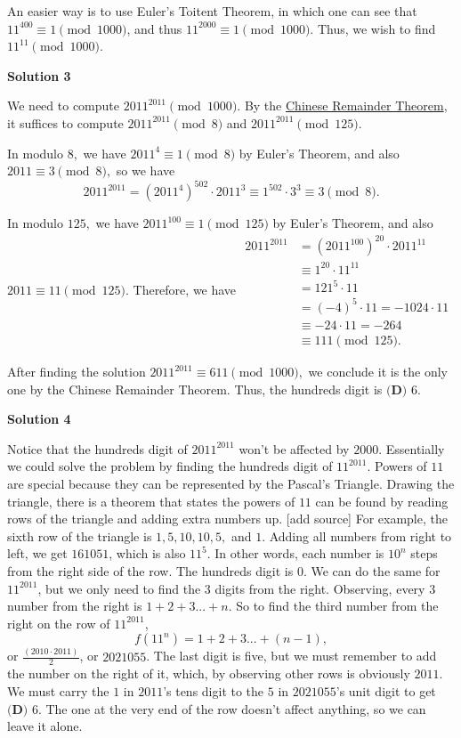 \begin{enumerate}
 An easier way is to use Euler's Toitent Theorem, in which one can see that $11^{400} \equiv 1 \pmod{1000}$, and thus $11^{2000} \equiv 1 \pmod{1000}$. Thus, we wish to find $11^{11} \pmod {1000}$.

 



\textbf{Solution 3}

We need to compute $2011^{2011} \pmod{1000}.$ By the \href{https://artofproblemsolving.com/wiki/index.php?title=Chinese\_Remainder\_Theorem}{Chinese Remainder Theorem}, it suffices to compute $2011^{2011} \pmod{8}$ and $2011^{2011} \pmod{125}.$

 In modulo $8,$ we have $2011^4 \equiv 1 \pmod{8}$ by Euler's Theorem, and also $2011 \equiv 3 \pmod{8},$ so we have 
 \[2011^{2011} = (2011^4)^{502} \cdot 2011^3 \equiv 1^{502} \cdot 3^3 \equiv 3 \pmod{8}.\]

 In modulo $125,$ we have $2011^{100} \equiv 1 \pmod{125}$ by Euler's Theorem, and also $2011 \equiv 11 \pmod{125}.$ Therefore, we have $\begin{aligned} 2011^{2011} &= (2011^{100})^{20} \cdot 2011^{11} \\ &\equiv 1^{20} \cdot 11^{11} \\ &= 121^5 \cdot 11 \\ &= (-4)^5 \cdot 11 = -1024 \cdot 11 \\ &\equiv -24 \cdot 11 = -264 \\ &\equiv 111 \pmod{125}. \end{aligned}$

 After finding the solution $2011^{2011} \equiv 611 \pmod{1000},$ we conclude it is the only one by the Chinese Remainder Theorem. Thus, the hundreds digit is $\boxed{\textbf{(D) } 6}.$




\textbf{Solution 4}

Notice that the hundreds digit of $2011^{2011}$ won't be affected by $2000$. Essentially we could solve the problem by finding the hundreds digit of $11^{2011}$. Powers of $11$ are special because they can be represented by the Pascal's Triangle. Drawing the triangle, there is a theorem that states the powers of $11$ can be found by reading rows of the triangle and adding extra numbers up. [add source] For example, the sixth row of the triangle is $1, 5, 10, 10, 5,$ and $1$. Adding all numbers from right to left, we get $161051$, which is also $11^5$. In other words, each number is $10^n$ steps from the right side of the row. The hundreds digit is $0$. We can do the same for $11^{2011}$, but we only need to find the $3$ digits from the right. Observing, every $3$ number from the right is $1 + 2 + 3... + n$. So to find the third number from the right on the row of $11^{2011}$, 
 \[f(11^n) = 1 + 2 + 3... + (n-1),\] or $\frac{(2010 \cdot 2011)}{2}$, or $2021055$. The last digit is five, but we must remember to add the number on the right of it, which, by observing other rows is obviously $2011$. We must carry the $1$ in $2011$'s tens digit to the $5$ in $2021055$'s unit digit to get $\boxed{\textbf{(D) } 6}$. The one at the very end of the row doesn't affect anything, so we can leave it alone.


\end{enumerate}
